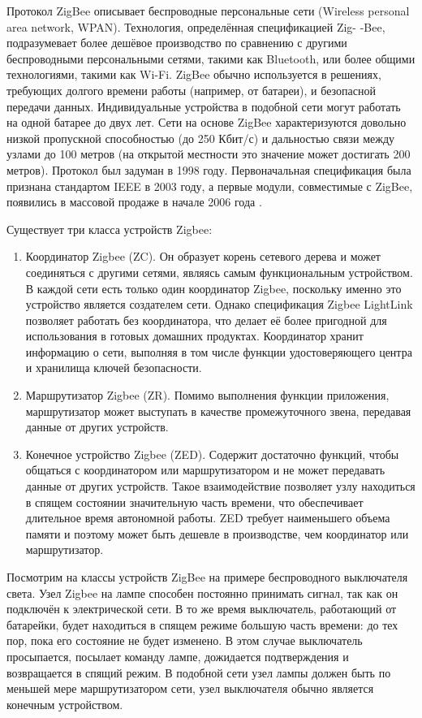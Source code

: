 	Протокол ZigBee описывает беспроводные персональные сети (Wireless personal area network, WPAN).
	Технология, определённая спецификацией Zig- \newline -Bee, подразумевает более дешёвое производство по
	сравнению с другими беспроводными персональными сетями, такими как Bluetooth, или более общими
	технологиями, такими как Wi-Fi. ZigBee обычно используется в решениях, требующих долгого времени
	работы (например, от батареи), и безопасной передачи данных.
	Индивидуальные устройства в подобной сети могут работать на одной батарее до двух лет.
	Сети на основе ZigBee характеризуются довольно низкой пропускной способностью (до 250 Кбит/с) и
	дальностью связи между узлами до 100 метров (на открытой местности это значение может достигать
	200 метров). Протокол был задуман в 1998 году. Первоначальная спецификация была признана стандартом 
	IEEE в 2003 году, а первые модули, совместимые с ZigBee, появились в массовой продаже в начале 2006 года
	 \cite{zigbee-certified-products}.
	
	Существует три класса устройств Zigbee:
	
	\begin{enumerate}
		\item Координатор Zigbee (ZC). Он образует корень сетевого дерева и может соединяться с другими 
		сетями, являясь самым функциональным устройством. В каждой сети есть только один координатор 
		Zigbee, поскольку именно это устройство является создателем сети. Однако спецификация Zigbee 
		LightLink позволяет работать без координатора, что делает её более пригодной для использования 
		в готовых домашних продуктах. Координатор хранит информацию о сети, выполняя в том числе функции 
		удостоверяющего центра и хранилища ключей безопасности.
		\item Маршрутизатор Zigbee (ZR). Помимо выполнения функции приложения, маршрутизатор может 
		выступать в качестве промежуточного звена, передавая данные от других устройств.
		\item Конечное устройство Zigbee (ZED). Содержит достаточно функций, чтобы общаться с координатором 
		или маршрутизатором и не может передавать данные от других устройств. Такое взаимодействие 
		позволяет узлу находиться в спящем состоянии значительную часть времени, что обеспечивает 
		длительное время автономной работы. ZED требует наименьшего объема памяти и поэтому может 
		быть дешевле в производстве, чем координатор или маршрутизатор.
	\end{enumerate}

	Посмотрим на классы устройств ZigBee на примере беспроводного выключателя света. Узел Zigbee на лампе 
	способен постоянно принимать сигнал, так как он подключён к электрической сети. В то же время выключатель, 
	работающий от батарейки, будет находиться в спящем режиме большую часть времени: до тех пор, пока 
	его состояние не будет изменено. В этом случае выключатель просыпается, посылает команду лампе, 
	дожидается подтверждения и возвращается в спящий режим. В подобной сети узел лампы должен быть 
	по меньшей мере маршрутизатором сети, узел выключателя обычно является конечным устройством.
	
